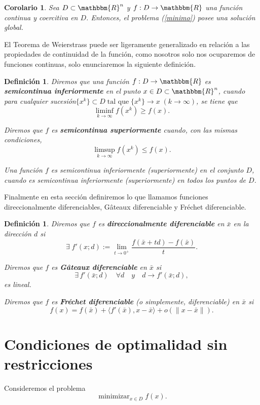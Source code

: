 \documentclass[a4paper,12pt]{report}
\newcommand{\la}{\langle}
\newcommand{\ra}{\rangle}
\newcommand{\RR}{\mathbbm{R}}
\newcommand{\Rn}{\RR^n}
\newcommand{\bx}{\bar{x}}
\newcommand{\mini}{\mathop{\mathrm{minimizar}}_{x\in D}f(x)}
\newcommand{\arr}{\rightarrow}
\newtheorem{cor}[teo]{Corolario}
\newtheorem{defi}[teo]{Definici\'on}
\begin{document}
\begin{cor}\label{cor:coercitiva}
Sea $D\subset\Rn$ y $f:D\arr\RR$ una funci\'on continua y coercitiva en $D$. Entonces, el problema (\ref{minimo}) posee una soluci\'on global.
\end{cor}

El Teorema de Weierstrass puede ser ligeramente generalizado en relaci\'on a las propiedades de continuidad de la funci\'on, como nosotros solo nos ocuparemos de funciones continuas, solo enunciaremos la siguiente definici\'on.

\begin{defi} Diremos que una funci\'on $f:D\arr\RR$ es \textbf{semicontinua inferiormente} en el punto $x\in D\subset \Rn$, cuando para cualquier sucesi\'on\linebreak $\{x^k\}\subset D\;\mbox{tal que}\;\{x^k\}\arr x\; (k\arr \infty )$, se tiene que 
\begin{equation}\label{sci}
\liminf_{k\arr \infty} f(x^k)\geq f(x).
\end{equation}  

Diremos que $f$ es \textbf{semicontinua superiormente} cuando, con las mismas condiciones,
\begin{equation}\label{scs}
\limsup_{k\arr\infty}f(x^k)\leq f(x).
\end{equation} 

Una funci\'on $f$ es semicontinua inferiormente (superiormente) en el conjunto $D$, cuando es semicontinua inferiormente (superiormente) en todos los puntos de $D$.
\end{defi}

Finalmente en esta secci\'on definiremos lo que llamamos funciones direccionalmente diferenciables, G\^ateaux diferenciable y Fr\'echet diferenciable.

\begin{defi} Diremos que $f$ es \textbf{direccionalmente diferenciable} en $\bx$ en la direcci\'on $d$ si $$\exists\;f'(x;d):=\lim_{t\arr 0^+}\frac{f(\bx+td)-f(\bx)}{t}.$$

Diremos que $f$ es \textbf{G\^ateaux diferenciable} en $\bx$ si $$\exists\, f'(\bx;d)\quad\forall d\quad y\quad d\arr f'(\bx;d),$$ es lineal.

Diremos que $f$ es \textbf{Fr\'echet diferenciable} (o simplemente, diferenciable) en $\bx$ si $$f(x)=f(\bx)+\la f'(\bx),x-\bx\ra+o(\| x-\bx\|).$$
\end{defi}


\section{Condiciones de optimalidad sin restricciones}
Consideremos el problema
\begin{equation}\label{msr}
\mini.
\end{equation}
\end{document}

